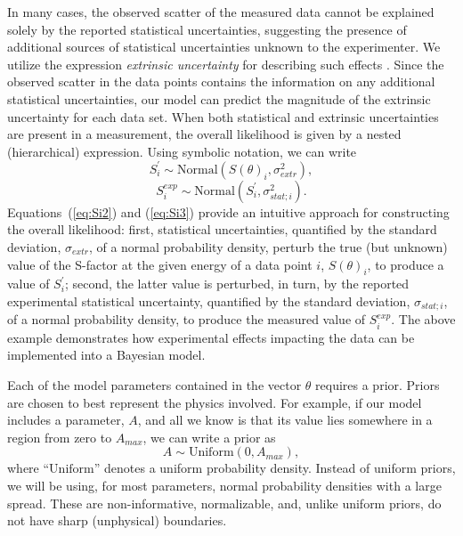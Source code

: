 \documentclass[twocolumn]{aastex63}
\begin{document}
In many cases, the observed scatter of the measured data cannot be explained solely by the reported statistical uncertainties, suggesting the presence of additional sources of statistical uncertainties unknown to the experimenter. We utilize the expression \emph{extrinsic uncertainty} for describing such effects \citep{deSouza:2019gf}. Since the observed scatter in the data points contains the information on any additional statistical uncertainties, our model can predict the magnitude of the extrinsic uncertainty for each data set. When both statistical and extrinsic uncertainties are present in a measurement, the overall likelihood is given by a nested (hierarchical) expression. Using symbolic notation, we can write
%
\begin{equation}
\label{eq:Si2}
 S^{\prime}_{i} \sim \mathrm{Normal}(S(\theta)_{i},\sigma^2_{extr}),
\end{equation}
%
\begin{equation}
\label{eq:Si3}
 S^{exp}_i \sim \mathrm{Normal}(S^{\prime}_i,\sigma^2_{stat;i}).
\end{equation}
%
Equations~(\ref{eq:Si2}) and (\ref{eq:Si3}) provide an intuitive approach for constructing the overall likelihood: first, statistical uncertainties, quantified by the standard deviation, $\sigma_{extr}$, of a normal probability density, perturb the true (but unknown) value of the S-factor at the given energy of a data point $i$, $S(\theta)_i$, to produce a value of $S^{\prime}_i$; second, the latter value is perturbed, in turn, by the reported experimental statistical uncertainty, quantified by the standard deviation, $\sigma_{stat;i}$, of a normal probability density, to produce the measured value of $S^{exp}_i$. The above example demonstrates how experimental effects impacting the data can be implemented into a Bayesian model.
 
Each of the model parameters contained in the vector $\theta$ requires a prior. Priors are chosen to best represent the physics involved. For example, if our model includes a parameter, $A$, and all we know is that its value lies somewhere in a region from zero to $A_{max}$, we can write a prior as
%
\begin{equation}
\label{eq:prior}
 A \sim \mathrm{Uniform}(0,A_{max}),
\end{equation}
%
where ``$\mathrm{Uniform}$'' denotes a uniform probability density. Instead of uniform priors, we will be using, for most parameters, normal probability densities with a large spread. These are non-informative, normalizable, and, unlike uniform priors, do not have sharp (unphysical) boundaries.
 
\end{document}
